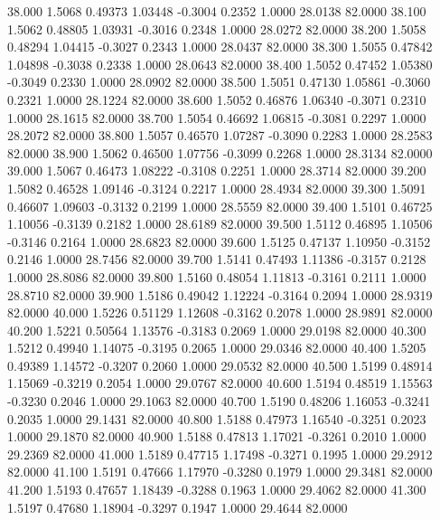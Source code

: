   38.000   1.5068   0.49373   1.03448  -0.3004   0.2352   1.0000  28.0138  82.0000
  38.100   1.5062   0.48805   1.03931  -0.3016   0.2348   1.0000  28.0272  82.0000
  38.200   1.5058   0.48294   1.04415  -0.3027   0.2343   1.0000  28.0437  82.0000
  38.300   1.5055   0.47842   1.04898  -0.3038   0.2338   1.0000  28.0643  82.0000
  38.400   1.5052   0.47452   1.05380  -0.3049   0.2330   1.0000  28.0902  82.0000
  38.500   1.5051   0.47130   1.05861  -0.3060   0.2321   1.0000  28.1224  82.0000
  38.600   1.5052   0.46876   1.06340  -0.3071   0.2310   1.0000  28.1615  82.0000
  38.700   1.5054   0.46692   1.06815  -0.3081   0.2297   1.0000  28.2072  82.0000
  38.800   1.5057   0.46570   1.07287  -0.3090   0.2283   1.0000  28.2583  82.0000
  38.900   1.5062   0.46500   1.07756  -0.3099   0.2268   1.0000  28.3134  82.0000
  39.000   1.5067   0.46473   1.08222  -0.3108   0.2251   1.0000  28.3714  82.0000
  39.200   1.5082   0.46528   1.09146  -0.3124   0.2217   1.0000  28.4934  82.0000
  39.300   1.5091   0.46607   1.09603  -0.3132   0.2199   1.0000  28.5559  82.0000
  39.400   1.5101   0.46725   1.10056  -0.3139   0.2182   1.0000  28.6189  82.0000
  39.500   1.5112   0.46895   1.10506  -0.3146   0.2164   1.0000  28.6823  82.0000
  39.600   1.5125   0.47137   1.10950  -0.3152   0.2146   1.0000  28.7456  82.0000
  39.700   1.5141   0.47493   1.11386  -0.3157   0.2128   1.0000  28.8086  82.0000
  39.800   1.5160   0.48054   1.11813  -0.3161   0.2111   1.0000  28.8710  82.0000
  39.900   1.5186   0.49042   1.12224  -0.3164   0.2094   1.0000  28.9319  82.0000
  40.000   1.5226   0.51129   1.12608  -0.3162   0.2078   1.0000  28.9891  82.0000
  40.200   1.5221   0.50564   1.13576  -0.3183   0.2069   1.0000  29.0198  82.0000
  40.300   1.5212   0.49940   1.14075  -0.3195   0.2065   1.0000  29.0346  82.0000
  40.400   1.5205   0.49389   1.14572  -0.3207   0.2060   1.0000  29.0532  82.0000
  40.500   1.5199   0.48914   1.15069  -0.3219   0.2054   1.0000  29.0767  82.0000
  40.600   1.5194   0.48519   1.15563  -0.3230   0.2046   1.0000  29.1063  82.0000
  40.700   1.5190   0.48206   1.16053  -0.3241   0.2035   1.0000  29.1431  82.0000
  40.800   1.5188   0.47973   1.16540  -0.3251   0.2023   1.0000  29.1870  82.0000
  40.900   1.5188   0.47813   1.17021  -0.3261   0.2010   1.0000  29.2369  82.0000
  41.000   1.5189   0.47715   1.17498  -0.3271   0.1995   1.0000  29.2912  82.0000
  41.100   1.5191   0.47666   1.17970  -0.3280   0.1979   1.0000  29.3481  82.0000
  41.200   1.5193   0.47657   1.18439  -0.3288   0.1963   1.0000  29.4062  82.0000
  41.300   1.5197   0.47680   1.18904  -0.3297   0.1947   1.0000  29.4644  82.0000
